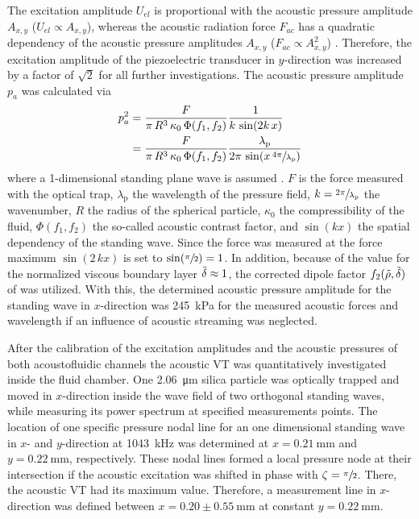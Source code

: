The excitation amplitude $U_{el}$ is proportional with the acoustic pressure 
amplitude $A_{x,y}$ ($U_{el} \propto A_{x,y}$), whereas the acoustic radiation 
force $F_{ac}$ has a quadratic dependency of the acoustic pressure amplitudes 
$A_{x,y}$ ($F_{ac} \propto A_{x,y}^2$) \cite{Barnkob2010}. Therefore, the 
excitation amplitude of the piezoelectric transducer in $y$-direction was 
increased by a factor of $\sqrt{2}$ for all further investigations. The acoustic 
pressure amplitude $p_{a}$ was calculated via
\begin{equation}
\label{eq:VT-PressurePredictions}
\begin{split}
p_{a}^{2} &= \frac{F}{\pi\,R^{3}\,\kappa_{0}\,\Phi(f_{1},f_{2})} 
\frac{1}{k\,\sin(2k\,x)}\\
&= \frac{F}{\pi\,R^{3}\,\kappa_{0}\,\Phi(f_{1},f_{2})} 
\frac{\lambda_{\text{p}}}{2\pi\,\sin(x\,\sfrac{4\pi}{\lambda_{\text{p}}})}
\end{split}
\end{equation}
where a 1-dimensional standing plane wave is assumed \cite{Settnes2012a}. $F$ is 
the force measured with the optical trap, $\lambda_{\text{p}}$ the wavelength of 
the pressure field, $k = \sfrac{2\pi}{\lambda_{\text{p}}}$ the wavenumber, $R$ 
the radius of the spherical particle, $\kappa_{0}$ the compressibility of the 
fluid, $\Phi(f_{1},f_{2})$ the so-called acoustic contrast factor, and 
$\sin(kx)$ the spatial dependency of the standing wave.  Since the force was 
measured at the force maximum $\sin(2\,kx)$ is set to $\sin(\sfrac{\pi}{2}) = 
1$. In addition, because of the value for the normalized viscous boundary layer 
$\tilde{\delta} \approx 1$, the corrected dipole factor  
$f_{2}(\tilde{\rho},\tilde{\delta})$ of \citeauthor{Settnes2012} 
\cite{Settnes2012} was utilized. With this, the determined acoustic pressure 
amplitude for the standing wave in $x$-direction was \SI{245}{\kilo\pascal} for 
the measured acoustic forces and wavelength if an influence of acoustic 
streaming was neglected. 

After the calibration of the excitation amplitudes and the acoustic pressures of 
both acoustofluidic channels the acoustic VT was quantitatively investigated 
inside the fluid chamber. One \SI{2.06}{\micro\meter} silica particle was 
optically trapped and moved in $x$-direction inside the wave field of two 
orthogonal standing waves, while measuring its power spectrum at specified 
measurements points. The location of one specific pressure nodal line for an one 
dimensional standing wave in $x$- and $y$-direction at \SI{1043}{\kilo\hertz} 
was determined at $x=\SI{0.21}{\mm}$ and $y=\SI{0.22}{\mm}$, respectively. These 
nodal lines formed a local pressure node at their intersection if the acoustic 
excitation was shifted in phase with $\zeta = \sfrac{\pi}{2}$. There, the 
acoustic VT had its maximum value. Therefore, a measurement line in 
$x$-direction was defined between $x=0.20\pm0.55~\si{\milli\meter}$ at constant 
$y=\SI{0.22}{\milli\meter}$.

